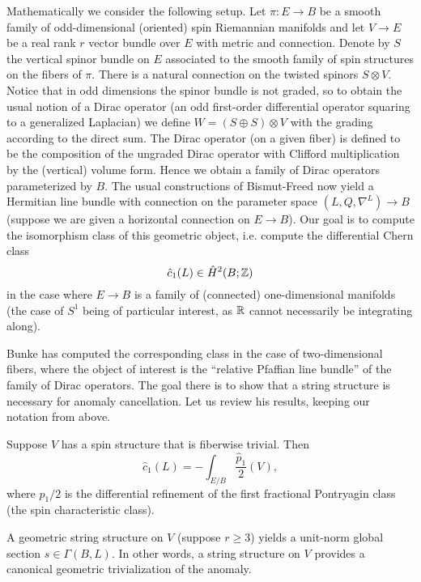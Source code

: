 \documentclass{amsart}
\begin{document}
Mathematically we consider the following setup. Let $\pi:E\to B$ be a smooth family of
odd-dimensional (oriented) spin Riemannian manifolds and let $V\to E$ be a real
rank $r$ vector bundle over $E$ with metric and connection.
Denote by $S$ the vertical spinor bundle on $E$
associated to the smooth family of spin structures on the fibers of $\pi$.
There is a natural connection on the twisted spinors $S\otimes V$. Notice that
in odd dimensions the spinor bundle is not graded, so to obtain the usual notion
of a Dirac operator (an odd first-order differential operator squaring to a
generalized Laplacian) we define $W=(S\oplus S)\otimes V$ with the grading
according to the direct sum. The Dirac operator (on a given fiber) is defined
to be the composition of the ungraded Dirac operator with Clifford multiplication
by the (vertical) volume form. Hence we obtain a family of Dirac operators
parameterized by $B$. The usual constructions of Bismut-Freed now yield a 
Hermitian line bundle with connection on the parameter space $(L,Q,\nabla^L)\to B$
(suppose we are given a horizontal connection on $E\to B$).
Our goal is to compute the isomorphism class of this geometric object, i.e.
compute the differential Chern class
\begin{equation*}
    \hat c_1(L) \in \hat H^2(B; \mathbb{Z})
\end{equation*}
in the case where $E\to B$ is a family of (connected) one-dimensional manifolds
(the case of $S^1$ being of particular interest, as $\mathbb{R}$ cannot necessarily be
integrating along).

Bunke has computed the corresponding class in the case of two-dimensional fibers,
where the object of interest is the ``relative Pfaffian line bundle'' of the
family of Dirac operators. The goal there is to show that a string structure
is necessary for anomaly cancellation. Let us review his results, keeping our notation from above.
\begin{theorem}[Bunke]
    Suppose $V$ has a spin structure that is fiberwise trivial. Then
    \begin{equation*}
        \hat c_1(L) = - \int_{E/B} \frac{\hat p_1}{2}(V),
    \end{equation*}
    where $\hat p_1/2$ is the differential refinement of the first fractional
    Pontryagin class (the spin characteristic class).
\end{theorem}

\begin{theorem}[Bunke]
    A geometric string structure on $V$ (suppose $r\geq 3$) yields a unit-norm
    global section $s\in\Gamma(B, L)$. In other words, a string structure on
    $V$ provides a canonical geometric trivialization of the anomaly.
\end{theorem}
\end{document}
